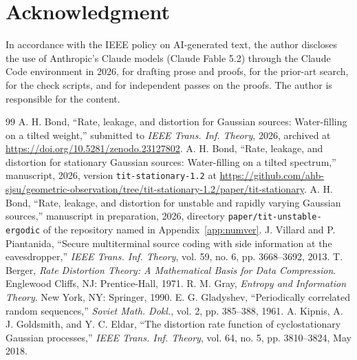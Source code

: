 \documentclass[11pt,onecolumn]{IEEEtran}
\begin{document}
\section*{Acknowledgment}

In accordance with the IEEE policy on AI-generated text, the author
discloses the use of Anthropic's Claude models (Claude Fable 5.2)
through the Claude Code environment in 2026, for drafting prose and
proofs, for the prior-art search, for the check scripts, and for
independent passes on the proofs. The author is responsible for the
content.

\begin{thebibliography}{99}
 A. H. Bond, ``Rate, leakage, and distortion for Gaussian
sources: Water-filling on a tilted weight,'' submitted to \emph{IEEE
Trans. Inf. Theory}, 2026, archived at
\url{https://doi.org/10.5281/zenodo.23127802}.
 A. H. Bond, ``Rate, leakage, and distortion for
stationary Gaussian sources: Water-filling on a tilted spectrum,''
manuscript, 2026, version \texttt{tit-stationary-1.2} at
\url{https://github.com/ahb-sjsu/geometric-observation/tree/tit-stationary-1.2/paper/tit-stationary}.
 A. H. Bond, ``Rate, leakage, and distortion for
unstable and rapidly varying Gaussian sources,'' manuscript in
preparation, 2026, directory \texttt{paper/tit-unstable-ergodic} of the
repository named in Appendix~\ref{app:numver}.
 J. Villard and P. Piantanida, ``Secure multiterminal
source coding with side information at the eavesdropper,'' \emph{IEEE
Trans. Inf. Theory}, vol. 59, no. 6, pp. 3668--3692, 2013.
 T. Berger, \emph{Rate Distortion Theory: A Mathematical
Basis for Data Compression}. Englewood Cliffs, NJ: Prentice-Hall, 1971.
 R. M. Gray, \emph{Entropy and Information Theory}.
New York, NY: Springer, 1990.
 E. G. Gladyshev, ``Periodically correlated random
sequences,'' \emph{Soviet Math. Dokl.}, vol. 2, pp. 385--388, 1961.
 A. Kipnis, A. J. Goldsmith, and Y. C. Eldar, ``The
distortion rate function of cyclostationary Gaussian processes,''
\emph{IEEE Trans. Inf. Theory}, vol. 64, no. 5, pp. 3810--3824, May 2018.

\end{thebibliography}
\end{document}
